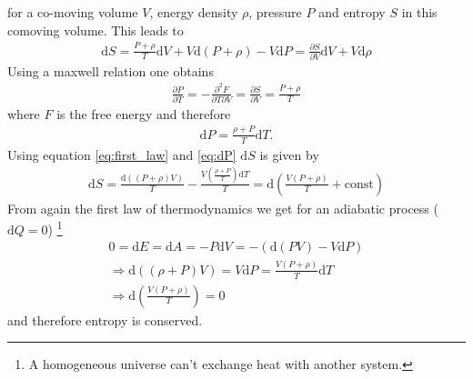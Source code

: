 \documentclass[twoside,a4paper, 12pt]{article}
\newcommand{\diff}{\mathrm{d}}
\numberwithin{equation}{section}
\begin{document}
for a co-moving volume $V$, energy density $\rho$, pressure $P$ and entropy $S$ in this comoving volume.
This leads to
\begin{align*}
    \diff S = \frac{P + \rho}{T} \diff V + V \diff (P + \rho) - V \diff P
            = \frac{\partial S}{\partial V} \diff V + V \diff \rho
\end{align*}
Using a maxwell relation one obtains
\begin{align*}
    \frac{\partial P}{\partial T} = - \frac{\partial^2 F}{\partial T \partial V} = \frac{\partial S}{\partial V} = \frac{P + \rho}{T}
\end{align*}
where $F$ is the free energy and therefore
\begin{align}
    \label{eq:dP}
    \diff P = \frac{\rho + P}{T} \diff T.
\end{align}
Using equation \eqref{eq:first_law} and \eqref{eq:dP}  $\diff S$ is given by
\begin{align}
    \diff S = \frac{\diff((P + \rho)V)}{T} - \frac{V\left(\frac{\rho + P}{T}\right) \diff T}{T}
    = \diff \left( \frac{V(P + \rho)}{T} + \mathrm{const} \right)
\end{align}
From again the first law of thermodynamics we get for an adiabatic process ($\diff Q = 0$)
\footnote{A homogeneous universe can't exchange heat with another system.}
\begin{align*}
    0 = \diff E = \diff A = - P \diff V = - (\diff (P V) - V \diff P) \\
    \Rightarrow \diff ((\rho + P) V) = V \diff P = \frac{V(P + \rho)}{T} \diff T \\
    \Rightarrow \diff \left( \frac{V(P + \rho)}{T} \right) = 0
\end{align*}
and therefore entropy is conserved.
\end{document}

